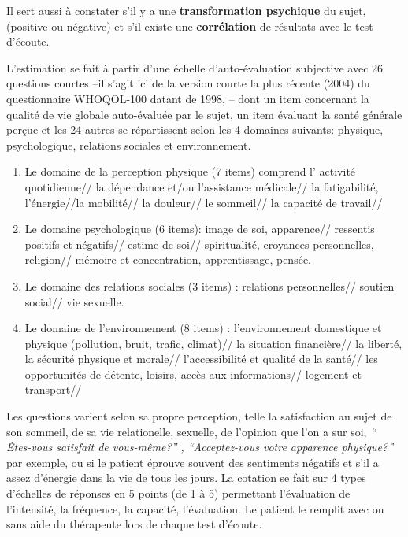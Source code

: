Il sert aussi à constater s'il y a une\textbf{ transformation psychique }du sujet,
 (positive ou négative) et s'il existe une \textbf{corrélation }de
 résultats avec le test d'écoute.


        L'estimation se fait à partir d'une échelle
d'auto-évaluation subjective avec 26 questions courtes
--il s'agit ici de la version courte  la plus récente (2004) du questionnaire
 WHOQOL-100 datant de 1998, --
dont un item concernant la qualité de vie globale
auto-évaluée par le sujet, un item évaluant la santé générale perçue
et les 24 autres se répartissent selon les 4 domaines suivants: physique, psychologique, relations sociales et environnement.
\begin{enumerate}
\item  Le domaine de la perception physique (7 items) comprend l' activité quotidienne// la dépendance et/ou l'assistance médicale// la fatigabilité, l'énergie//la mobilité// la douleur// le sommeil// la capacité de travail//
	\item Le domaine psychologique (6 items):  image de soi, apparence// ressentis positifs et négatifs// estime de soi// spiritualité, croyances personnelles, religion// mémoire et concentration, apprentissage, pensée.
		\item Le domaine des relations sociales (3 items) : relations personnelles// soutien social// vie sexuelle.
			\item Le domaine de l'environnement (8 items) :
                         l'environnement domestique et physique
                         (pollution, bruit, trafic, climat)// la
                         situation financière//  la liberté, la
                         sécurité physique et morale//
                         l'accessibilité et qualité de la santé// les
                         opportunités de détente, loisirs, accès aux
                         informations// logement et transport//
\end{enumerate}
		Les questions varient selon sa propre perception, telle la satisfaction
au sujet de son  sommeil, de sa vie relationelle, sexuelle, de
l'opinion que l'on a sur soi, \textit{`` Êtes-vous satisfait de
vous-même?'' , ``Acceptez-vous votre apparence physique?''} par
exemple, ou si le patient éprouve souvent des sentiments négatifs
et s'il a assez d'énergie dans la vie de tous les jours.
La cotation se fait sur 4 types d'échelles de réponses en 5 points (de 1 à 5)
permettant l'évaluation de l'intensité, la fréquence, la capacité, l'évaluation.
Le patient le remplit avec ou sans aide du
thérapeute lors de chaque test
d'écoute.


